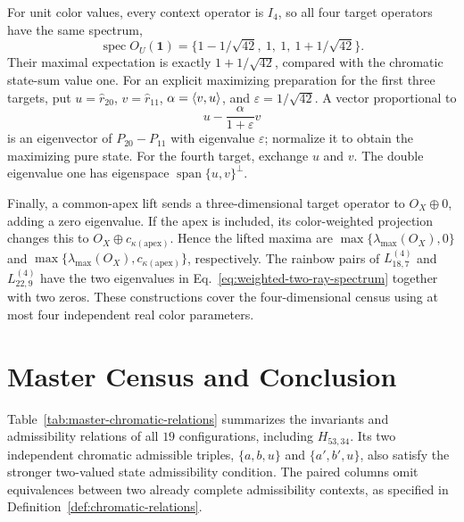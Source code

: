 \documentclass[aps,pra,reprint,superscriptaddress,longbibliography,nofootinbib,floatfix,10pt]{revtex4-2}
\theoremstyle{definition}\newtheorem{definition}[theorem]{Definition}
\theoremstyle{remark}\newtheorem{remark}[theorem]{Remark}
\begin{document}
For unit color values, every context operator is $I_4$, so all four target operators have the same spectrum,
\begin{equation}\label{eq:weighted-L22-unit-spectrum}
\operatorname{spec}O_U(\mathbf1)
=\{1-1/\sqrt{42},\ 1,\ 1,\ 1+1/\sqrt{42}\}.
\end{equation}
Their maximal expectation is exactly $1+1/\sqrt{42}$, compared with the chromatic state-sum value one. For an explicit maximizing preparation for the first three targets, put $u=\hat r_{20}$, $v=\hat r_{11}$, $\alpha=\langle v,u\rangle$, and $\varepsilon=1/\sqrt{42}$. A vector proportional to
\[
u-\frac{\alpha}{1+\varepsilon}v
\]
is an eigenvector of $P_{20}-P_{11}$ with eigenvalue $\varepsilon$; normalize it to obtain the maximizing pure state. For the fourth target, exchange $u$ and $v$. The double eigenvalue one has eigenspace $\operatorname{span}\{u,v\}^{\perp}$.

Finally, a common-apex lift sends a three-dimensional target operator to $O_X\oplus0$, adding a zero eigenvalue. If the apex is included, its color-weighted projection changes this to $O_X\oplus c_{\kappa(\mathrm{apex})}$. Hence the lifted maxima are $\max\{\lambda_{\max}(O_X),0\}$ and $\max\{\lambda_{\max}(O_X),c_{\kappa(\mathrm{apex})}\}$, respectively. The rainbow pairs of $L_{18,7}^{(4)}$ and $L_{22,9}^{(4)}$ have the two eigenvalues in Eq.~\eqref{eq:weighted-two-ray-spectrum} together with two zeros. These constructions cover the four-dimensional census using at most four independent real color parameters.

\section{Master Census and Conclusion}\label{sec:conclusion}

Table~\ref{tab:master-chromatic-relations} summarizes the invariants and admissibility relations of all $19$ configurations, including $H_{53,34}$. Its two independent chromatic admissible triples, $\{a,b,u\}$ and $\{a',b',u\}$, also satisfy the stronger two-valued state admissibility condition. The paired columns omit equivalences between two already complete admissibility contexts, as specified in Definition~\ref{def:chromatic-relations}.
\end{document}
